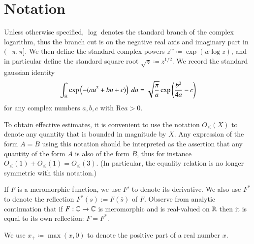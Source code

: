 \section{Notation}

Unless otherwise specified, $\log$ denotes the standard branch of the complex logarithm, thus the branch cut is on the negative real axis and imaginary part in $(-\pi,\pi]$.  We then define the standard complex powers $z^w \coloneqq \exp( w \log z)$, and in particular define the standard square root $\sqrt{z} \coloneqq z^{1/2}$.  We record the standard gaussian identity
\begin{equation}\label{gaussian}
 \int_{\mathbb{R}} \exp\left(-(au^2+bu+c)\right)\ du = \sqrt{\frac{\pi}{a}} \exp\left( \frac{b^2}{4a} - c\right)
\end{equation}
for any complex numbers $a,b,c$ with $\mathrm{Re} a > 0$.

To obtain effective estimates, it is convenient to use the notation $O_{\leq}(X)$ to denote any quantity that is bounded in magnitude by $X$.  Any expression of the form $A=B$ using this notation should be interpreted as the assertion that any quantity of the form $A$ is also of the form $B$, thus for instance $O_{\leq}(1) + O_{\leq}(1) = O_{\leq}(3)$.  (In particular, the equality relation is no longer symmetric with this notation.)

If $F$ is a meromorphic function, we use $F'$ to denote its derivative.  We also use $F^*$ to denote the reflection $F^*(s) := \overline{F(\overline{s})}$ of $F$.  Observe from analytic continuation that if $F:\mathbb{C} \to \mathbb{C}$ is meromorphic and is real-valued on $\mathbb{R}$ then it is equal to its own reflection: $F = F^*$.

We use $x_+ \coloneqq \max(x,0)$ to denote the positive part of a real number $x$.  
